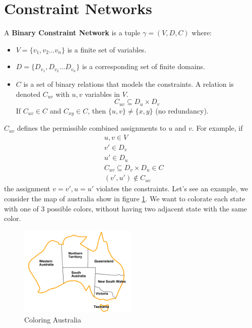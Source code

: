 \documentclass[10pt, letterpaper]{report}
\begin{document}
\section{Constraint Networks}
\begin{definition}
    A \textbf{Binary Constraint Network} is a tuple $\gamma=(V,D,C)$ where:
    \end{definition}\begin{itemize}
        \item $V=\{v_1,v_2\dots v_n\}$ is a finite set of variables. 
        \item $D=\{D_{v_1},D_{v_2}\dots D_{v_n}\}$ is a corresponding set of finite domains.
        \item $C$ is a set of binary relations that models the constraints. A relation is denoted $C_{uv}$ with $u,v$ variables in $V$. $$C_{uv}\subseteq D_u\times D_v$$If $C_{uv}\in C$ and $C_{xy}\in C$, then $\{u,v\}\ne \{x,y\}$ (no redundancy).
    \end{itemize}
    $C_{uv}$ defines the permissible combined assignments to $u$ and $v$. For example, if\begin{align}
        &u,v\in V\\
        &v'\in D_{v}\\ 
        &u' \in D_{u}\\ 
        & C_{uv}\subseteq D_{v}\times D_{u} \in C\\
        &(v',u')\notin C_{uv}
    \end{align}
the assignment $v=v', u=u'$ violates the constraints. Let's see an example, we consider the map of australia show in figure \ref{fig:australia}. We want to colorate each state with one of 3 possible colors, without having two adjacent state with the same color.\bigskip

\begin{figure}[h!]
    \centering
    \includegraphics[width=0.5\textwidth ]{images/australia.png}
    \caption{Coloring Australia}
    \label{fig:australia}
\end{figure}
\end{document}
